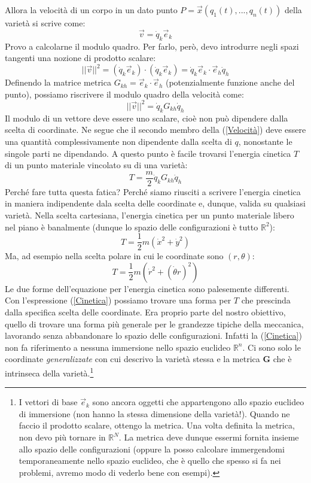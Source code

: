 \documentclass[a4paper,openany]{article}
\begin{document}
	Allora la velocità di un corpo in un dato punto $P = \vec{x}(q_{1}(t), ..., q_{n}(t))$ della varietà si scrive come:
	$$
	\vec{v} = \dot{q}_{k}\vec{e}_{k}
	$$
	Provo a calcolarne il modulo quadro. Per farlo, però, devo introdurre negli spazi tangenti una nozione di prodotto scalare:
	\begin{equation}
		||\vec{v}||^{2} = (\dot{q}_{k}\vec{e}_{k} )\cdot(\dot{q}_{k}\vec{e}_{k}) = \dot{q}_{k} \vec{e}_{k} \cdot \vec{e}_{h} \dot{q}_{h}
	\end{equation}
	Definendo la matrice metrica $G_{kh} = \vec{e}_{k} \cdot \vec{e}_{h}$ (potenzialmente funzione anche del punto), possiamo riscrivere il modulo quadro della velocità come:
	\begin{equation}
		||\vec{v}||^{2} = \dot{q}_{k}G_{kh}\dot{q}_{h}
		\label{Velocità}
	\end{equation}
	Il modulo di un vettore deve essere uno scalare, cioè non può dipendere dalla scelta di coordinate. Ne segue che il secondo membro della (\ref{Velocità}) deve essere una quantità complessivamente non dipendente dalla scelta di $q$, nonostante le singole parti ne dipendando.
	A questo punto è facile trovarsi l'energia cinetica $T$ di un punto materiale vincolato su di una varietà:
	\begin{equation}
		T = \dfrac{m}{2}\dot{q}_{k}G_{kh}\dot{q}_{h}
		\label{Cinetica}
	\end{equation}
	Perché fare tutta questa fatica? Perché siamo riusciti a scrivere l'energia cinetica in maniera indipendente dala scelta delle coordinate e, dunque, valida su qualsiasi varietà. Nella scelta cartesiana, l'energia cinetica per un punto materiale libero nel piano è banalmente (dunque lo spazio delle configurazioni è tutto $\mathbb{R}^2$):
	$$
	T = \dfrac{1}{2}m(\dot{x}^{2}+\dot{y}^{2})
	$$
	Ma, ad esempio nella scelta polare in cui le coordinate sono $(r,\theta)$:
	$$
	T = \dfrac{1}{2}m(\dot{r}^{2}+(\dot{\theta}r)^{2})
	$$
	Le due forme dell'equazione per l'energia cinetica sono palesemente differenti. Con l'espressione (\ref{Cinetica}) possiamo trovare una forma per $T$ che prescinda dalla specifica scelta delle coordinate. Era proprio parte del nostro obiettivo, quello di trovare una forma più generale per le grandezze tipiche della meccanica, lavorando senza abbandonare lo spazio delle configurazioni. Infatti la (\ref{Cinetica}) non fa riferimento a nessuna immersione nello spazio euclideo $\mathbb{R}^n$. Ci sono solo le coordinate \textit{generalizzate} con cui descrivo la varietà stessa e la metrica \textbf{G} che è intrinseca della varietà.\footnote{I vettori di base $\vec{e}_k$ sono ancora oggetti che appartengono allo spazio euclideo di immersione (non hanno la stessa dimensione della varietà!). Quando ne faccio il prodotto scalare, ottengo la metrica. Una volta definita la metrica, non devo più tornare in $\mathbb{R}^{N}$. La metrica deve dunque essermi fornita insieme allo spazio delle configurazioni (oppure la posso calcolare immergendomi temporaneamente nello spazio euclideo, che è quello che spesso si fa nei problemi, avremo modo di vederlo bene con esempi).}
	
\end{document}

